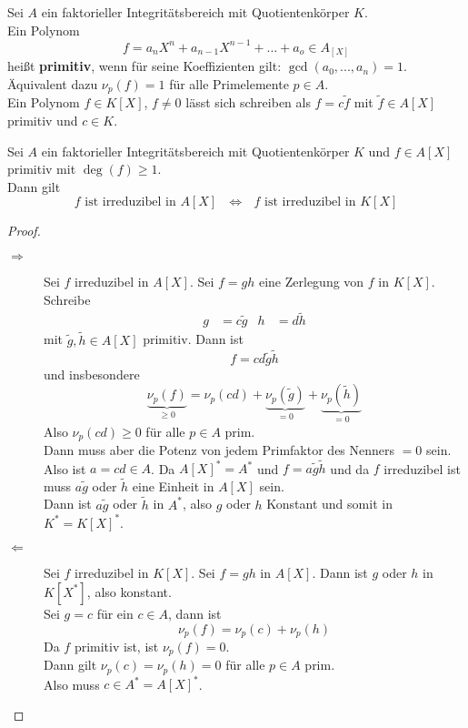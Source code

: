 	\begin{definition}
		Sei $A$ ein faktorieller Integritätsbereich mit Quotientenkörper $K$.\\
		Ein Polynom
		\[f=a_nX^n+a_{n-1}X^{n-1}+...+a_o\in A_[X]\]
		heißt \textbf{primitiv}, wenn für seine Koeffizienten gilt: $\gcd(a_0,...,a_n)=1$.\\
		Äquivalent dazu $\nu_p(f)=1$ für alle Primelemente $p\in A$.\\
		Ein Polynom $f\in K[X]$, $f\neq 0$ lässt sich schreiben als $f=c\tilde f$ mit $\tilde f\in A[X]$ primitiv und $c\in K$.
	\end{definition}
	
	\begin{satz}\label{vorsatzvong}
		Sei $A$ ein faktorieller Integritätsbereich mit Quotientenkörper $K$ und $f\in A[X]$ primitiv mit $\deg(f)\geq1$.\\
		Dann gilt
		\[\text{$f$ ist irreduzibel in $A[X]$ }\Leftrightarrow \text{ $f$ ist irreduzibel in $K[X]$}\]
	\end{satz}
	\begin{proof}
		\begin{description}
			\item[$\Rightarrow$] Sei $f$ irreduzibel in $A[X]$. Sei $f=gh$ eine Zerlegung von $f$ in $K[X]$.\\
			Schreibe
			\begin{align*}
			g&=c\tilde g&h&=d\tilde h
			\end{align*}
			mit $\tilde{g},\tilde h\in A[X]$ primitiv. Dann ist
			\[f=cd\tilde g\tilde h\]
			und insbesondere
			\[\underbrace{\nu_p(f)}_{\geq 0}=\nu_p(cd)+\underbrace{\nu_p(\tilde g)}_{=0}+\underbrace{\nu_p(\tilde h)}_{=0}\]
			Also $\nu_p(cd)\geq 0$ für alle $p\in A$ prim.\\
			Dann muss aber die Potenz von jedem Primfaktor des Nenners $=0$ sein.\\
			Also ist $a=cd\in A$. Da $A[X]^*=A^*$ und $f=a\tilde g\tilde h$ und da $f$ irreduzibel ist muss $a\tilde g$ oder $\tilde h$ eine Einheit in $A[X]$ sein.\\
			Dann ist $a\tilde g$ oder $\tilde h$ in $A^*$, also $g$ oder $h$ Konstant und somit in $K^*=K[X]^*$.
			\item[$\Leftarrow$] Sei $f$ irreduzibel in $K[X]$. Sei $f=gh$ in $A[X]$. Dann ist $g$ oder $h$ in $K[X^*]$, also konstant.\\
			Sei $g=c$ für ein $c\in A$, dann ist
			\[\nu_p(f)=\nu_p(c)+\nu_p(h)\]
			Da $f$ primitiv ist, ist $\nu_p(f)=0$.\\
			Dann gilt $\nu_p(c)=\nu_p(h)=0$ für alle $p\in A$ prim.\\
			Also muss $c\in A^*=A[X]^*$.
		\end{description}
	\end{proof}

